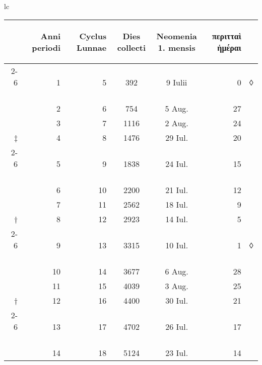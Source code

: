 %
\footnotesize
\centering
\begin{tabular}{lc}
\begin{tabular}[t]{r rrccr l}
~ &
\begin{rotate}{60}Anni periodi\end{rotate} &
\begin{rotate}{60}Cyclus Lunnae\end{rotate} &
\begin{rotate}{60}Dies collecti\end{rotate} &
\begin{rotate}{60}\hspace{5pt}\parbox[t]{3.5cm}{Neomenia\\1. mensis}\end{rotate} &
\begin{rotate}{60}\textgreek{περιτταὶ ἡμέραι}\end{rotate} &
~
\\
\cline{2-6}
~ &  1 &  5 &  392 &  9 Iulii & 0 & ◊ \\
~ &  2 &  6 &  754 &  5 Aug. & 27 & ~ \\
~ &  3 &  7 & 1116 &  2 Aug. & 24 & ~ \\
‡ &  4 &  8 & 1476 & 29 Iul. & 20 \\
\cline{2-6}
~ &  5 &  9 & 1838 & 24 Iul. & 15 \\
~ &  6 & 10 & 2200 & 21 Iul. & 12 \\
~ &  7 & 11 & 2562 & 18 Iul. &  9 \\
† &  8 & 12 & 2923 & 14 Iul. &  5 \\
\cline{2-6}
~ &  9 & 13 & 3315 & 10 Iul. &  1 & ◊\\
~ & 10 & 14 & 3677 &  6 Aug. & 28 \\
~ & 11 & 15 & 4039 &  3 Aug. & 25 \\
† & 12 & 16 & 4400 & 30 Iul. & 21 \\
\cline{2-6}
~ & 13 & 17 & 4702 & 26 Iul. & 17 \\
~ & 14 & 18 & 5124 & 23 Iul. & 14 \\

\end{tabular}
\end{tabular}
